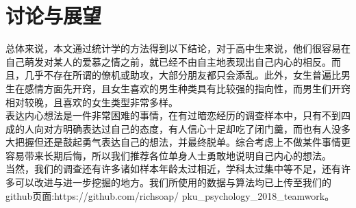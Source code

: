 \documentclass[10pt, a4paper, twocolumn]{ctexart}
\begin{document}
\section{讨论与展望}
总体来说，本文通过统计学的方法得到以下结论，对于高中生来说，他们很容易在自己萌发对某人的爱慕之情之前，就已经不由自主地表现出自己内心的相反。而且，几乎不存在所谓的僚机或助攻，大部分朋友都只会添乱。此外，女生普遍比男生在感情方面先开窍，且女生喜欢的男生种类具有比较强的指向性，而男生们开窍相对较晚，且喜欢的女生类型非常多样。\\
\indent 表达内心想法是一件非常困难的事情，在有过暗恋经历的调查样本中，只有不到四成的人向对方明确表达过自己的态度，有人信心十足却吃了闭门羹，而也有人没多大把握但还是鼓起勇气表达自己的想法，并最终脱单。综合考虑上不做某件事情更容易带来长期后悔，所以我们推荐各位单身人士勇敢地说明自己内心的想法。\\
\indent 当然，我们的调查还有许多诸如样本年龄太过相近，学科太过集中等不足，还有许多可以改进与进一步挖掘的地方。我们所使用的数据与算法均已上传至我们的github页面:https://github.com/richsoap/
pku\_psychology\_2018\_teamwork。\\
%
%
\end{document}
